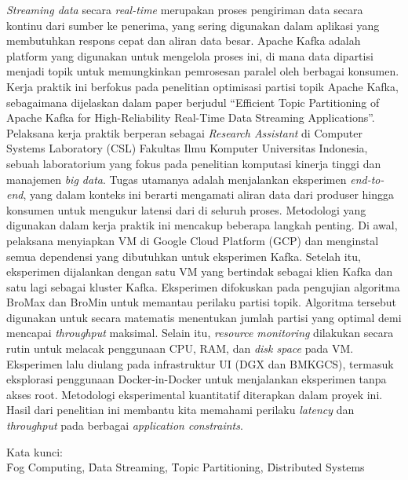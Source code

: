 \noindent \textit{Streaming data} secara \textit{real-time} merupakan proses pengiriman data secara kontinu dari sumber ke penerima, yang sering digunakan dalam aplikasi yang membutuhkan respons cepat dan aliran data besar. Apache Kafka adalah platform yang digunakan untuk mengelola proses ini, di mana data dipartisi menjadi topik untuk memungkinkan pemrosesan paralel oleh berbagai konsumen. Kerja praktik ini berfokus pada penelitian optimisasi partisi topik Apache Kafka, sebagaimana dijelaskan dalam paper berjudul ``Efficient Topic Partitioning of Apache Kafka for High-Reliability Real-Time Data Streaming Applications''. Pelaksana kerja praktik berperan sebagai \textit{Research Assistant} di Computer Systems Laboratory (CSL) Fakultas Ilmu Komputer Universitas Indonesia, sebuah laboratorium yang fokus pada penelitian komputasi kinerja tinggi dan manajemen \textit{big data}. Tugas utamanya adalah menjalankan eksperimen \textit{end-to-end}, yang dalam konteks ini berarti mengamati aliran data dari produser hingga konsumen untuk mengukur latensi dari di seluruh proses. Metodologi yang digunakan dalam kerja praktik ini mencakup beberapa langkah penting. Di awal, pelaksana menyiapkan VM di Google Cloud Platform (GCP) dan menginstal semua dependensi yang dibutuhkan untuk eksperimen Kafka. Setelah itu, eksperimen dijalankan dengan satu VM yang bertindak sebagai klien Kafka dan satu lagi sebagai kluster Kafka. Eksperimen difokuskan pada pengujian algoritma BroMax dan BroMin untuk memantau perilaku partisi topik. Algoritma tersebut digunakan untuk secara matematis menentukan jumlah partisi yang optimal demi mencapai \textit{throughput} maksimal. Selain itu, \textit{resource monitoring} dilakukan secara rutin untuk melacak penggunaan CPU, RAM, dan \textit{disk space} pada VM. Eksperimen lalu diulang pada infrastruktur UI (DGX dan BMKGCS), termasuk eksplorasi penggunaan Docker-in-Docker untuk menjalankan eksperimen tanpa akses root. Metodologi eksperimental kuantitatif diterapkan dalam proyek ini. Hasil dari penelitian ini membantu kita memahami perilaku \textit{latency} dan \textit{throughput} pada berbagai \textit{application constraints}. \\

\vspace*{0.2cm}

\noindent Kata kunci: \\ \f{Fog Computing}, \f{Data Streaming}, \f{Topic Partitioning}, \f{Distributed Systems} \\

\newpage
